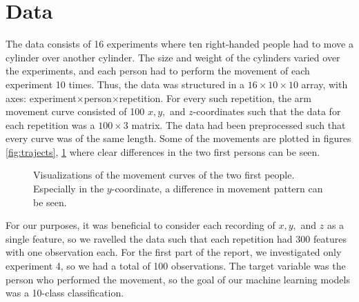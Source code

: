 \documentclass[11pt,fleqn]{article}
\begin{document}
\section{Data}
The data consists of 16 experiments where ten right-handed people had to move a cylinder over another cylinder.
The size and weight of the cylinders varied over the experiments, and each person had to perform the movement of each experiment 10 times.
Thus, the data was structured in a $ 16\times 10\times 10 $ array, with axes: experiment\(\times\)person\(\times\)repetition.
For every such repetition, the arm movement curve consisted of 100 $ x, y, $ and $ z $-coordinates such that the data for each repetition was a $ 100\times 3 $ matrix.
The data had been preprocessed such that every curve was of the same length.
Some of the movements are plotted in figures \ref{fig:trajects}, \ref{fig:2dtrajects} where clear differences in the two first persons can be seen.


\begin{figure}[H]
	
	\centering
	\caption{Visualizations of the movement curves of the two first people. Especially in the \(y\)-coordinate, a difference in movement pattern can be seen.}
	\label{fig:2dtrajects}
\end{figure}\noindent 
For our purposes, it was beneficial to consider each recording of $ x, y, $ and $ z $ as a single feature, so we ravelled the data such that each repetition had $ 300 $ features with one observation each.
For the first part of the report, we investigated only experiment 4, so we had a total of 100 observations.
The target variable was the person who performed the movement, so the goal of our machine learning models was a 10-class classification.
\end{document}
